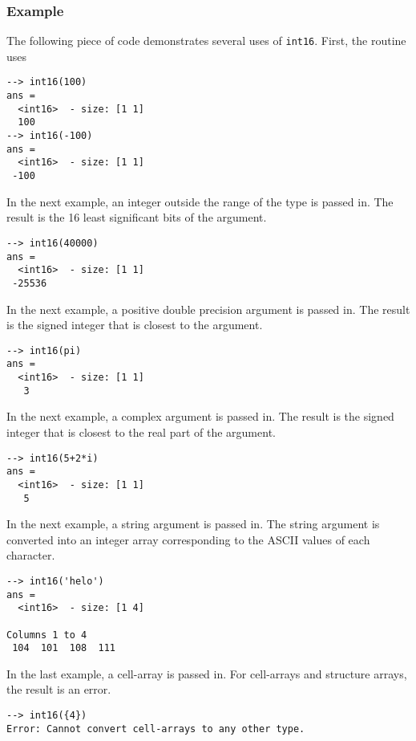 \subsubsection{Example}
The following piece of code demonstrates several uses of \verb|int16|.  First, the routine uses
\begin{verbatim}
--> int16(100)
ans =
  <int16>  - size: [1 1]
  100
--> int16(-100)
ans =
  <int16>  - size: [1 1]
 -100
\end{verbatim}
In the next example, an integer outside the range  of the type is passed in.  The result is the 16 least significant bits of the argument.
\begin{verbatim}
--> int16(40000)
ans =
  <int16>  - size: [1 1]
 -25536
\end{verbatim}
In the next example, a positive double precision argument is passed in.  The result is the signed integer that is closest to the argument.
\begin{verbatim}
--> int16(pi)
ans =
  <int16>  - size: [1 1]
   3
\end{verbatim}
In the next example, a complex argument is passed in.  The result is the signed integer that is closest to the real part of the argument.
\begin{verbatim}
--> int16(5+2*i)
ans =
  <int16>  - size: [1 1]
   5
\end{verbatim}
In the next example, a string argument is passed in.  The string argument is converted into an integer array corresponding to the ASCII values of each character.
\begin{verbatim}
--> int16('helo')
ans =
  <int16>  - size: [1 4]
  
Columns 1 to 4
 104  101  108  111
\end{verbatim}
In the last example, a cell-array is passed in.  For cell-arrays and structure arrays, the result is an error.
\begin{verbatim}
--> int16({4})
Error: Cannot convert cell-arrays to any other type.
\end{verbatim}
